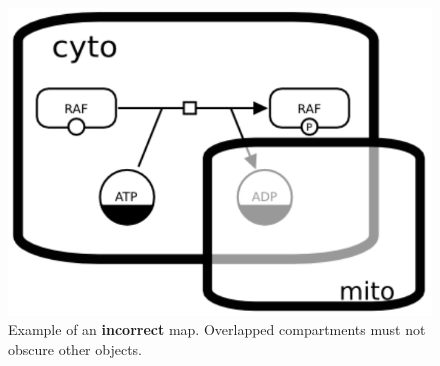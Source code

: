 \begin{figure}[H]
  \centering
  \includegraphics[scale = 0.45]{examples/compartment_overlapping_wrong}
  \caption{Example of an \textbf{incorrect} map.  Overlapped compartments must not obscure other objects.}
  \label{fig:overlap-bad}
\end{figure}




